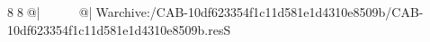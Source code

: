 8  8  @|                                                   @| W   archive:/CAB-10df623354f1c11d581e1d4310e8509b/CAB-10df623354f1c11d581e1d4310e8509b.resS 